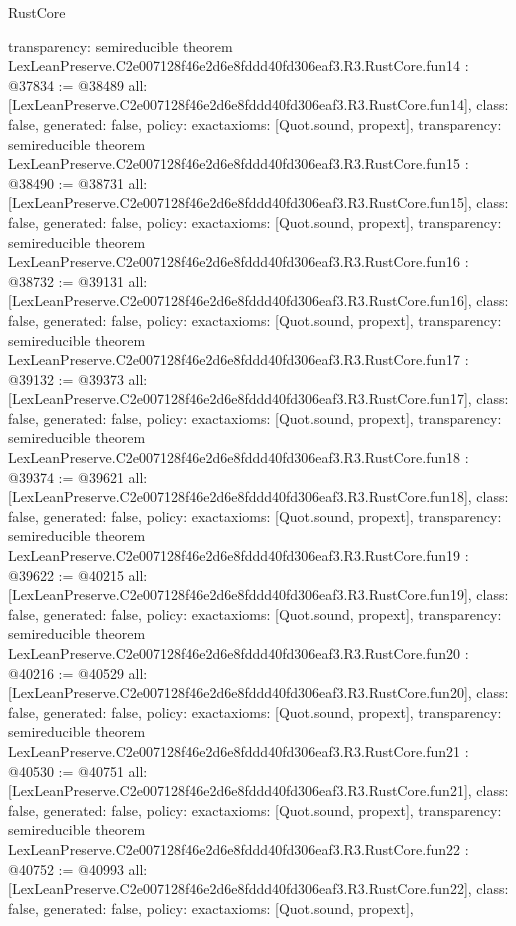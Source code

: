 \begin{lexlean}{RustCore}
\begin{coremodule}
{  transparency: semireducible
}
theorem LexLeanPreserve.C2e007128f46e2d6e8fddd40fd306eaf3.R3.RustCore.fun14 : @37834 := @38489 {
  all: [LexLeanPreserve.C2e007128f46e2d6e8fddd40fd306eaf3.R3.RustCore.fun14],
  class: false,
  generated: false,
  policy: exact{axioms: [Quot.sound, propext]},
  transparency: semireducible
}
theorem LexLeanPreserve.C2e007128f46e2d6e8fddd40fd306eaf3.R3.RustCore.fun15 : @38490 := @38731 {
  all: [LexLeanPreserve.C2e007128f46e2d6e8fddd40fd306eaf3.R3.RustCore.fun15],
  class: false,
  generated: false,
  policy: exact{axioms: [Quot.sound, propext]},
  transparency: semireducible
}
theorem LexLeanPreserve.C2e007128f46e2d6e8fddd40fd306eaf3.R3.RustCore.fun16 : @38732 := @39131 {
  all: [LexLeanPreserve.C2e007128f46e2d6e8fddd40fd306eaf3.R3.RustCore.fun16],
  class: false,
  generated: false,
  policy: exact{axioms: [Quot.sound, propext]},
  transparency: semireducible
}
theorem LexLeanPreserve.C2e007128f46e2d6e8fddd40fd306eaf3.R3.RustCore.fun17 : @39132 := @39373 {
  all: [LexLeanPreserve.C2e007128f46e2d6e8fddd40fd306eaf3.R3.RustCore.fun17],
  class: false,
  generated: false,
  policy: exact{axioms: [Quot.sound, propext]},
  transparency: semireducible
}
theorem LexLeanPreserve.C2e007128f46e2d6e8fddd40fd306eaf3.R3.RustCore.fun18 : @39374 := @39621 {
  all: [LexLeanPreserve.C2e007128f46e2d6e8fddd40fd306eaf3.R3.RustCore.fun18],
  class: false,
  generated: false,
  policy: exact{axioms: [Quot.sound, propext]},
  transparency: semireducible
}
theorem LexLeanPreserve.C2e007128f46e2d6e8fddd40fd306eaf3.R3.RustCore.fun19 : @39622 := @40215 {
  all: [LexLeanPreserve.C2e007128f46e2d6e8fddd40fd306eaf3.R3.RustCore.fun19],
  class: false,
  generated: false,
  policy: exact{axioms: [Quot.sound, propext]},
  transparency: semireducible
}
theorem LexLeanPreserve.C2e007128f46e2d6e8fddd40fd306eaf3.R3.RustCore.fun20 : @40216 := @40529 {
  all: [LexLeanPreserve.C2e007128f46e2d6e8fddd40fd306eaf3.R3.RustCore.fun20],
  class: false,
  generated: false,
  policy: exact{axioms: [Quot.sound, propext]},
  transparency: semireducible
}
theorem LexLeanPreserve.C2e007128f46e2d6e8fddd40fd306eaf3.R3.RustCore.fun21 : @40530 := @40751 {
  all: [LexLeanPreserve.C2e007128f46e2d6e8fddd40fd306eaf3.R3.RustCore.fun21],
  class: false,
  generated: false,
  policy: exact{axioms: [Quot.sound, propext]},
  transparency: semireducible
}
theorem LexLeanPreserve.C2e007128f46e2d6e8fddd40fd306eaf3.R3.RustCore.fun22 : @40752 := @40993 {
  all: [LexLeanPreserve.C2e007128f46e2d6e8fddd40fd306eaf3.R3.RustCore.fun22],
  class: false,
  generated: false,
  policy: exact{axioms: [Quot.sound, propext]},
}
\end{coremodule}
\end{lexlean}
